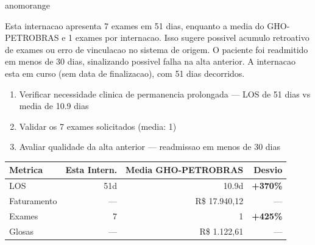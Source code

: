 \documentclass[a4paper,10pt]{article}
\begin{document}
\begin{anomalycard}[Internacao 163887 | GHO-PETROBRAS | ALTO (z=3.76)]{anomorange}
\vspace{2pt}\begin{tcolorbox}[colback=severityred!20,colframe=anomorange,title={\textbf{Interpretacao de Negocio}},fonttitle=\bfseries\small,left=4pt,right=4pt,top=3pt,bottom=3pt]
{\small Esta internacao apresenta 7 exames em 51 dias, enquanto a media do GHO-PETROBRAS e 1 exames por internacao. Isso sugere possivel acumulo retroativo de exames ou erro de vinculacao no sistema de origem. O paciente foi readmitido em menos de 30 dias, sinalizando possivel falha na alta anterior. A internacao esta em curso (sem data de finalizacao), com 51 dias decorridos.}
\end{tcolorbox}
\begin{tcolorbox}[colback=severityyellow!30,colframe=anomorange,title={\textbf{Recomendacoes Especificas}},fonttitle=\bfseries\small,left=4pt,right=4pt,top=3pt,bottom=3pt]
\begin{enumerate}[nosep,leftmargin=16pt]
\item {\small Verificar necessidade clinica de permanencia prolongada --- LOS de 51 dias vs media de 10.9 dias}
\item {\small Validar os 7 exames solicitados (media: 1)}
\item {\small Avaliar qualidade da alta anterior --- readmissao em menos de 30 dias}
\end{enumerate}
\end{tcolorbox}
\begin{center}\begin{tabular}{l r r r}\toprule\textbf{Metrica} & \textbf{Esta Intern.} & \textbf{Media GHO-PETROBRAS} & \textbf{Desvio} \\\midrule
LOS & 51d & 10.9d & \textcolor{anomred}{\textbf{+370\%}} \\
Faturamento & --- & R\$ 17.940,12 & --- \\
Exames & 7 & 1 & \textcolor{anomred}{\textbf{+425\%}} \\
Glosas & --- & R\$ 1.122,61 & --- \\
\bottomrule\end{tabular}\end{center}


\end{anomalycard}
\end{document}
